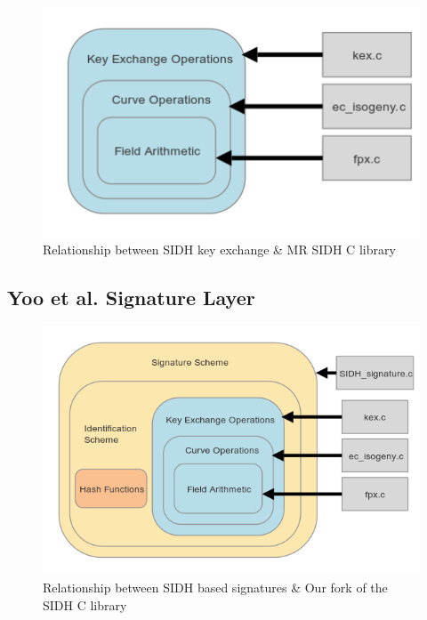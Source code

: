 \begin{figure}[htb]
\centering
\includegraphics[scale=0.7]{halfmapwcurve.png} %
\caption{Relationship between SIDH key exchange \& MR SIDH C library}
\label{fig:halfmap} %
\end{figure}

\subsection{Yoo et al. Signature Layer}

\begin{figure}[htb]
\centering
\includegraphics[scale=0.7]{fullmapwcurve.png} %
\caption{Relationship between SIDH based signatures \& Our fork of the SIDH C library}
\label{fig:fullmap} %
\end{figure}


